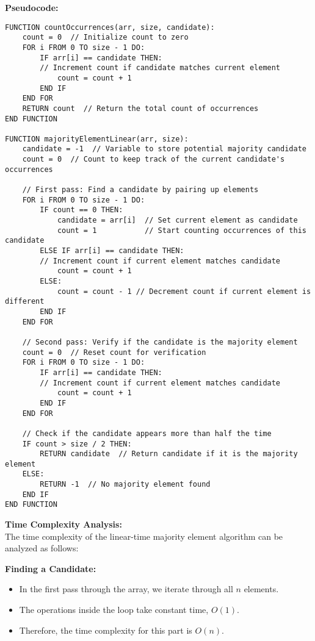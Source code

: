 \documentclass[a4paper,12pt]{report}
\begin{document}
\textbf{Pseudocode:}

\begin{tcolorbox}[colback=white, colframe=black, boxrule=0.5pt]
\ttfamily\small
\begin{verbatim}
FUNCTION countOccurrences(arr, size, candidate):
    count = 0  // Initialize count to zero
    FOR i FROM 0 TO size - 1 DO:
        IF arr[i] == candidate THEN:
		// Increment count if candidate matches current element
            count = count + 1  
        END IF
    END FOR
    RETURN count  // Return the total count of occurrences
END FUNCTION

FUNCTION majorityElementLinear(arr, size):
    candidate = -1  // Variable to store potential majority candidate
    count = 0  // Count to keep track of the current candidate's occurrences

    // First pass: Find a candidate by pairing up elements
    FOR i FROM 0 TO size - 1 DO:
        IF count == 0 THEN:
            candidate = arr[i]  // Set current element as candidate
            count = 1           // Start counting occurrences of this candidate
        ELSE IF arr[i] == candidate THEN:
 		// Increment count if current element matches candidate	
            count = count + 1 
        ELSE:
            count = count - 1 // Decrement count if current element is different
        END IF
    END FOR

    // Second pass: Verify if the candidate is the majority element
    count = 0  // Reset count for verification
    FOR i FROM 0 TO size - 1 DO:
        IF arr[i] == candidate THEN:
		// Increment count if current element matches candidate
            count = count + 1  
        END IF
    END FOR

    // Check if the candidate appears more than half the time
    IF count > size / 2 THEN:
        RETURN candidate  // Return candidate if it is the majority element
    ELSE:
        RETURN -1  // No majority element found
    END IF
END FUNCTION
\end{verbatim}
\end{tcolorbox}

\large \textbf{Time Complexity Analysis:} \hfill \\

The time complexity of the linear-time majority element algorithm can be analyzed as follows:


     \textbf{Finding a Candidate:}
    \begin{itemize}
        \item In the first pass through the array, we iterate through all \(n\) elements.
        \item The operations inside the loop take constant time, \(O(1)\).
        \item Therefore, the time complexity for this part is \(O(n)\).
    \end{itemize}
\end{document}
